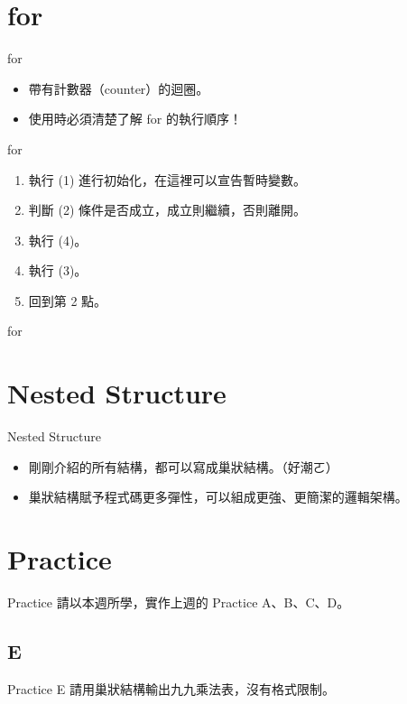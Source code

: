 \documentclass[t]{beamer}
\begin{document}
\section{for}
\begin{frame}{for}
  \begin{itemize}
    \item 帶有計數器（counter）的迴圈。
    \item 使用時必須清楚了解 for 的執行順序！
  \end{itemize}
\end{frame}

\begin{frame}{for}
  
  \begin{enumerate}
    \item 執行 (1) 進行初始化，在這裡可以宣告暫時變數。
    \item 判斷 (2) 條件是否成立，成立則繼續，否則離開。
    \item 執行 (4)。
    \item 執行 (3)。
    \item 回到第 2 點。
  \end{enumerate}
\end{frame}

\begin{frame}{for}
  
  
\end{frame}

\section{Nested Structure}
\begin{frame}{Nested Structure}
  \begin{itemize}
    \item 剛剛介紹的所有結構，都可以寫成巢狀結構。（好潮ㄛ）
    \item 巢狀結構賦予程式碼更多彈性，可以組成更強、更簡潔的邏輯架構。
    
  \end{itemize}
\end{frame}

\section{Practice}
\begin{frame}{Practice}
  請以本週所學，實作上週的 Practice A、B、C、D。
\end{frame}

\subsection{E}
\begin{frame}{Practice E}
  請用巢狀結構輸出九九乘法表，沒有格式限制。
\end{frame}
\end{document}
